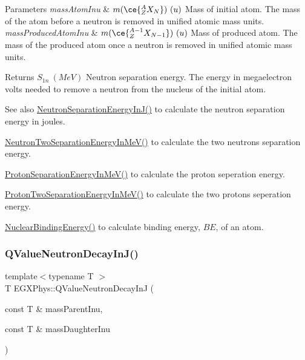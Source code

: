 \begin{DoxyParams}{Parameters}
{\em mass\+Atom\+Inu} & $m(\ce{ ^{A}_{Z}X_{N} })\ (u)$ Mass of initial atom. The mass of the atom before a neutron is removed in unified atomic mass units. \\
\hline
{\em mass\+Produced\+Atom\+Inu} & $m(\ce{ ^{A-1}_{Z}X_{N-1} })\ (u)$ Mass of produced atom. The mass of the produced atom once a neutron is removed in unified atomic mass units. \\
\hline
\end{DoxyParams}
\begin{DoxyReturn}{Returns}
$S_{1n}\ (MeV)$ Neutron separation energy. The energy in megaelectron volts needed to remove a neutron from the nucleus of the initial atom. 
\end{DoxyReturn}
\begin{DoxySeeAlso}{See also}
\hyperlink{group___nuclear_separation_energy_ga14a4bb972ae000ef4ff35f2734ff22d0}{Neutron\+Separation\+Energy\+In\+J()} to calculate the neutron separation energy in joules. 

\hyperlink{group___nuclear_separation_energy_ga09985fc876eb632695bfbc1f2f325401}{Neutron\+Two\+Separation\+Energy\+In\+Me\+V()} to calculate the two neutrons separation energy. 

\hyperlink{group___nuclear_separation_energy_ga6a619ded55c47ed22ea2d8a85202ebeb}{Proton\+Separation\+Energy\+In\+Me\+V()} to calculate the proton seperation energy. 

\hyperlink{group___nuclear_separation_energy_ga0de42783a7c650eb32f85dc2d40d84d7}{Proton\+Two\+Separation\+Energy\+In\+Me\+V()} to calculate the two protons seperation energy. 

\hyperlink{group___nuclear_binding_energy_gafea41a3c21704414394c3204b35aba98}{Nuclear\+Binding\+Energy()} to calculate binding energy, $BE$, of an atom. 
\end{DoxySeeAlso}
\mbox{\label{group___q_value_gab9ffbd12c3f814e03f0ed1fbdcba0700}} 
\subsubsection{\texorpdfstring{Q\+Value\+Neutron\+Decay\+In\+J()}{QValueNeutronDecayInJ()}}
{\footnotesize\ttfamily template$<$typename T $>$ \\
T E\+G\+X\+Phys\+::\+Q\+Value\+Neutron\+Decay\+InJ (\begin{DoxyParamCaption}\item[{const T \&}]{mass\+Parent\+Inu,  }\item[{const T \&}]{mass\+Daughter\+Inu }\end{DoxyParamCaption})}



